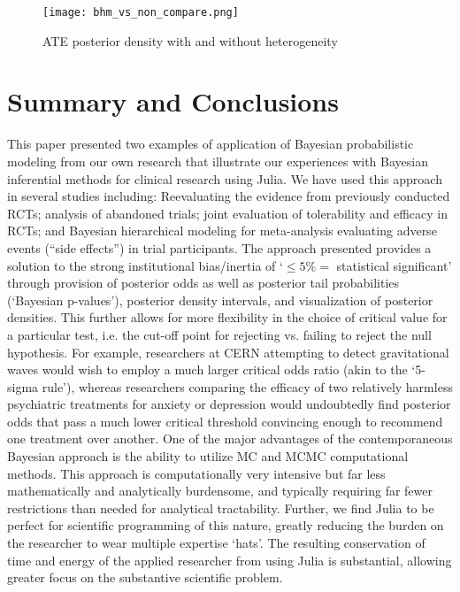 \documentclass{juliacon}
\begin{document}
\begin{figure}[t]
	\centerline{\texttt{[image: bhm\_vs\_non\_compare.png]}}
	\caption{ATE posterior density with and without heterogeneity}
	\label{fig:compare}
\end{figure}
 
\section{Summary and Conclusions}
This paper presented two examples of application of Bayesian probabilistic modeling from our own research that illustrate our experiences with Bayesian inferential methods for clinical research using Julia.  We have used this approach in several studies including: Reevaluating the evidence from previously conducted RCTs; analysis of abandoned trials; joint evaluation of tolerability and efficacy in RCTs; and Bayesian hierarchical modeling for meta-analysis evaluating adverse events (“side effects”) in trial participants.
\vskip 6pt
The approach presented provides a solution to the strong institutional bias/inertia of `$\le 5\% =$ statistical significant’ through provision of posterior odds as well as posterior tail probabilities (`Bayesian p-values’), posterior density intervals, and visualization of posterior densities. This further allows for more flexibility in the choice of critical value for a particular test, i.e. the cut-off point for rejecting vs. failing to reject the null hypothesis.  For example, researchers at CERN attempting to detect gravitational waves would wish to employ a much larger critical odds ratio (akin to the `5-sigma rule'), whereas researchers comparing the efficacy of two relatively harmless psychiatric treatments for anxiety or depression would undoubtedly find posterior odds that pass a much lower critical threshold convincing enough to recommend one treatment over another.  
\vskip 6pt
One of the major advantages of the contemporaneous Bayesian approach is 
the ability to utilize MC and MCMC computational methods. This approach is computationally very intensive but far less mathematically and analytically burdensome, and typically requiring far fewer restrictions than needed for analytical tractability.  Further, we find Julia to be  perfect for scientific programming of this nature, greatly reducing the burden on the researcher to wear multiple expertise `hats'. The resulting conservation of time and energy of the applied researcher from using Julia is substantial, allowing greater focus on the substantive scientific problem.




%
\end{document}
